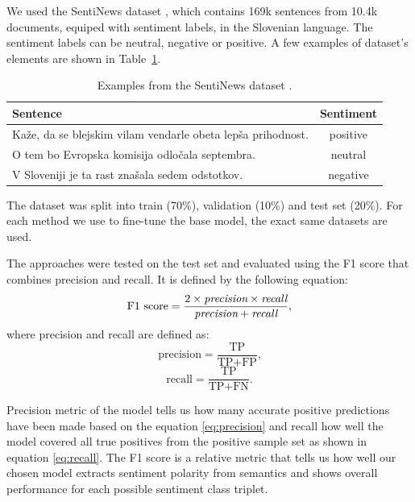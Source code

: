 \documentclass[fleqn,moreauthors,10pt]{ds_report}
\begin{document}
We used the SentiNews dataset \cite{sentiNews}, which contains 169k sentences from 10.4k documents, equiped with sentiment labels, in the Slovenian language. The sentiment labels can be neutral, negative or positive. A few examples of dataset's elements are shown in Table~\ref{tab1}.

\begin{table}[!h]
	\footnotesize
	\begin{center}
		\begin{tabular}{ |l|c| }
		\hline
		\rowcolor{Blue}Sentence & Sentiment \\
		\hline

		Kaže, da se blejskim vilam vendarle obeta lepša prihodnost. & positive\\
		O tem bo Evropska komisija odločala septembra. & neutral\\
		V Sloveniji je ta rast znašala sedem odstotkov. & negative\\

		\hline
		\end{tabular}
	\end{center}
\caption{Examples from the SentiNews dataset \cite{sentiNews}.}
\label{tab1}
\end{table}

The dataset was split into train (70\%), validation (10\%) and test set (20\%). For each method we use to fine-tune the base model, the exact same datasets are used.

The approaches were tested on the test set and evaluated using the F1 score that combines precision and recall. It is defined by the following equation:
\begin{equation}
	\text{F1 score} =\frac{2 \times \text{\it{precision}} \times \text{\it{recall}}}{\text{\it{precision}} + \text{\it{recall}}} \text{,}
\label{eq:f1}
\end{equation}
where precision and recall are defined as:
\begin{equation}
	\text{precision} =\frac {\text{TP}}{\text{TP} + \text{FP}} \text{,}
\label{eq:precision}
\end{equation}
\begin{equation}
	\text{recall} =\frac {\text{TP}}{\text{TP} + \text{FN}} \text{.}
\label{eq:recall}
\end{equation}

Precision metric of the model tells us how many accurate positive predictions have been made based on the equation \ref{eq:precision} and recall how well the model covered all true positives from the positive sample set as shown in equation \ref{eq:recall}. The F1 score is a relative metric that tells us how well our chosen model extracts sentiment polarity from semantics and shows overall performance for each possible sentiment class triplet.
\end{document}
